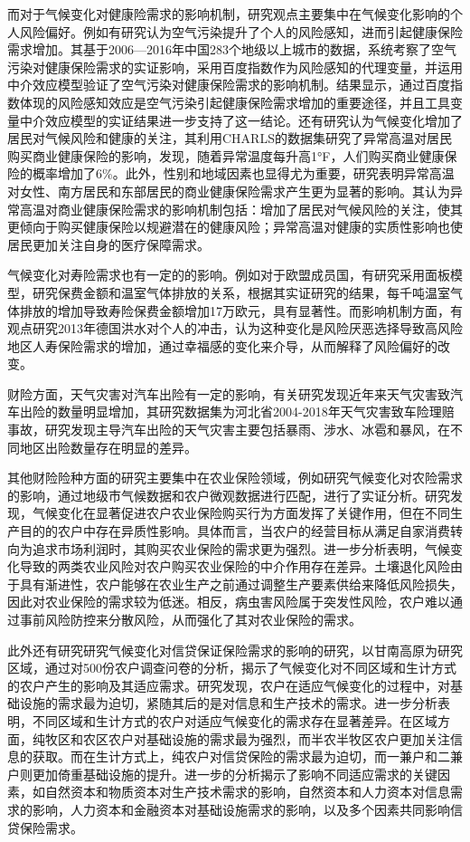 而对于气候变化对健康险需求的影响机制，研究观点主要集中在气候变化影响的个人风险偏好。例如有研究认为空气污染提升了个人的风险感知，进而引起健康保险需求增加\citep{宋平凡2022空气污染}。其基于2006—2016年中国283个地级以上城市的数据，系统考察了空气污染对健康保险需求的实证影响，采用百度指数作为风险感知的代理变量，并运用中介效应模型验证了空气污染对健康保险需求的影响机制。结果显示，通过百度指数体现的风险感知效应是空气污染引起健康保险需求增加的重要途径，并且工具变量中介效应模型的实证结果进一步支持了这一结论。还有研究认为气候变化增加了居民对气候风险和健康的关注\cite{zhong2022exposure}，其利用CHARLS的数据集研究了异常高温对居民购买商业健康保险的影响，发现，随着异常温度每升高1°F，人们购买商业健康保险的概率增加了6\%。此外，性别和地域因素也显得尤为重要，研究表明异常高温对女性、南方居民和东部居民的商业健康保险需求产生更为显著的影响。其认为异常高温对商业健康保险需求的影响机制包括：增加了居民对气候风险的关注，使其更倾向于购买健康保险以规避潜在的健康风险；异常高温对健康的实质性影响也使居民更加关注自身的医疗保障需求。

气候变化对寿险需求也有一定的的影响。例如对于欧盟成员国，有研究采用面板模型，研究保费金额和温室气体排放的关系\citep{melnychenko2021influence}，根据其实证研究的结果，每千吨温室气体排放的增加导致寿险保费金额增加17万欧元，具有显著性。而影响机制方面，有观点研究2013年德国洪水对个人的冲击\citep{avdeenko2021impact}，认为这种变化是风险厌恶选择导致高风险地区人寿保险需求的增加，通过幸福感的变化来介导，从而解释了风险偏好的改变。

财险方面，天气灾害对汽车出险有一定的影响，有关研究发现近年来天气灾害致汽车出险的数量明显增加\citep{张翠华2020天气灾害致车险理赔的风险分析}，其研究数据集为河北省2004-2018年天气灾害致车险理赔事故，研究发现主导汽车出险的天气灾害主要包括暴雨、涉水、冰雹和暴风，在不同地区出险数量存在明显的差异。

其他财险险种方面的研究主要集中在农业保险领域，例如研究气候变化对农险需求的影响\citep{胡新艳2021气候变化}，通过地级市气候数据和农户微观数据进行匹配，进行了实证分析。研究发现，气候变化在显著促进农户农业保险购买行为方面发挥了关键作用，但在不同生产目的的农户中存在异质性影响。具体而言，当农户的经营目标从满足自家消费转向为追求市场利润时，其购买农业保险的需求更为强烈。进一步分析表明，气候变化导致的两类农业风险对农户购买农业保险的中介作用存在差异。土壤退化风险由于具有渐进性，农户能够在农业生产之前通过调整生产要素供给来降低风险损失，因此对农业保险的需求较为低迷。相反，病虫害风险属于突发性风险，农户难以通过事前风险防控来分散风险，从而强化了其对农业保险的需求。

此外还有研究研究气候变化对信贷保证保险需求的影响的研究\citep{张钦2017高寒生态脆弱区农户对气候变化的适应需求}，以甘南高原为研究区域，通过对500份农户调查问卷的分析，揭示了气候变化对不同区域和生计方式的农户产生的影响及其适应需求。研究发现，农户在适应气候变化的过程中，对基础设施的需求最为迫切，紧随其后的是对信息和生产技术的需求。进一步分析表明，不同区域和生计方式的农户对适应气候变化的需求存在显著差异。在区域方面，纯牧区和农区农户对基础设施的需求最为强烈，而半农半牧区农户更加关注信息的获取。而在生计方式上，纯农户对信贷保险的需求最为迫切，而一兼户和二兼户则更加倚重基础设施的提升。进一步的分析揭示了影响不同适应需求的关键因素，如自然资本和物质资本对生产技术需求的影响，自然资本和人力资本对信息需求的影响，人力资本和金融资本对基础设施需求的影响，以及多个因素共同影响信贷保险需求。

